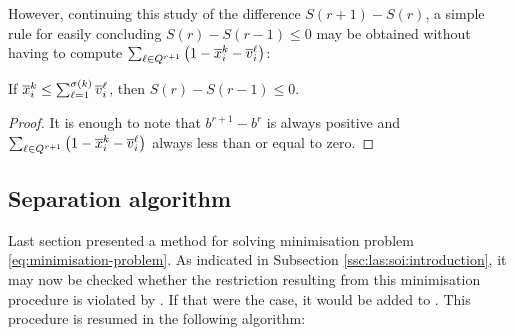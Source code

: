 However, continuing this study of the difference $S(r + 1) - S(r)$, a simple
rule for easily concluding $S(r) - S(r - 1) \leq 0$ may be obtained without
having to compute
$
    \sum_{\ell \in Q^{r + 1}} \left(1 - \overline{x}_i^k - \overline{v}_i^\ell\right)
$:

\begin{lemma}
    If
    $
        \overline{x}_i^k \leq \sum_{\ell = 1}^{\sigma(k)} \overline{v}_i^\ell
    $,
    then $S(r) - S(r - 1) \leq 0$.
\end{lemma}

\begin{proof}
    It is enough to note that $b^{r + 1} - b^r$ is always positive and
    $
        \sum_{\ell \in Q^{r + 1}}\left(1 - \overline{x}_i^k - \overline{v}_i^\ell\right)
    $
    always less than or equal to zero.
\end{proof}

\subsection{Separation algorithm} %
\label{ssc:las:soi:separation-algorithm}

Last section presented a method for solving minimisation problem
\eqref{eq:minimisation-problem}. As indicated in Subsection
\ref{ssc:las:soi:introduction}, it may now be checked whether the restriction
resulting from this minimisation procedure is violated by \fracsol. If that were
the case, it would be added to \slla. This procedure is resumed in the following
algorithm:


